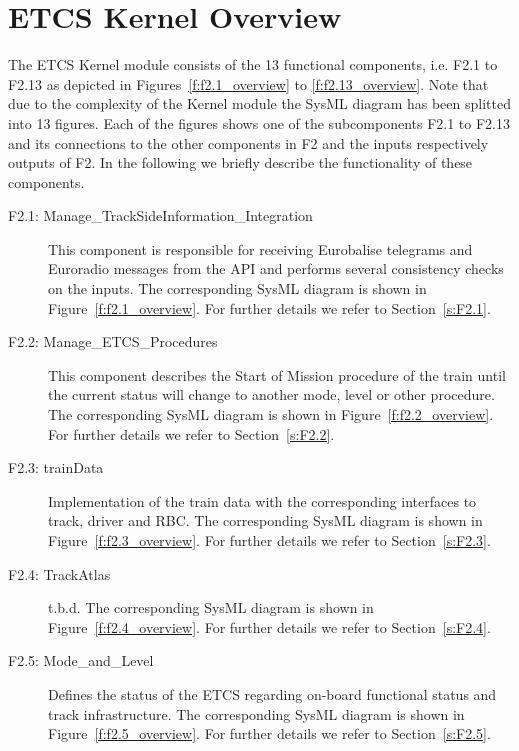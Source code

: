 \section{ETCS Kernel Overview}\label{s:ETCS_Kernel_Overview}

The ETCS Kernel module consists of the 13 functional components, i.e. F2.1 to F2.13 as depicted in Figures~\ref{f:f2.1_overview} to \ref{f:f2.13_overview}. Note that due to the complexity of the Kernel module the SysML diagram has been splitted into 13 figures. Each of the figures shows one of the subcomponents F2.1 to F2.13 and its connections to the other components in F2 and the inputs respectively outputs of F2. In the following we briefly describe the functionality of these components.
\begin{description}
\item[F2.1: Manage\_TrackSideInformation\_Integration] This component is responsible for receiving Eurobalise telegrams and Euroradio messages from the API and performs several consistency checks on the inputs. The corresponding SysML diagram is shown in Figure~\ref{f:f2.1_overview}. For further details we refer to Section~\ref{s:F2.1}.

\item[F2.2: Manage\_ETCS\_Procedures] This component describes the Start of Mission procedure of the train until the current status will change to another mode, level or other procedure. The corresponding SysML diagram is shown in Figure~\ref{f:f2.2_overview}. For further details we refer to Section~\ref{s:F2.2}.

\item[F2.3: trainData] Implementation of the train data with the corresponding interfaces to track, driver and RBC. The corresponding SysML diagram is shown in Figure~\ref{f:f2.3_overview}. For further details we refer to Section~\ref{s:F2.3}.

\item[F2.4: TrackAtlas] t.b.d.  The corresponding SysML diagram is shown in Figure~\ref{f:f2.4_overview}. For further details we refer to Section~\ref{s:F2.4}.

\item[F2.5: Mode\_and\_Level] Defines the status of the ETCS regarding on-board functional status and track infrastructure. The corresponding SysML diagram is shown in Figure~\ref{f:f2.5_overview}. For further details we refer to Section~\ref{s:F2.5}.


\end{description}
